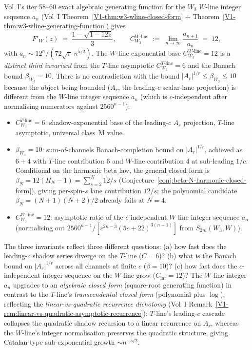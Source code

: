 \begin{remark}[\label{rem:beta-A-W3-wline-integer-sequence}
The $W_3$ $W$-line second lane: $C_{W_3}^{W\text{-line}} = 12$ is
a third invariant distinct from $\beta_{W_3} = 10$ and
$C_{W_3}^{T\text{-line}} = 6$]
Vol~I's iter 58--60 exact algebraic generating function for the
$W_3$ $W$-line integer sequence $a_n$
(Vol~I Theorem~\ref*{V1-thm:w3-wline-closed-form} +
Theorem~\ref*{V1-thm:w3-wline-generating-function}) gives
\[
 F'_{W}(z) \;=\; \frac{1 - \sqrt{1 - 12 z}}{3},
 \qquad
 C_{W_3}^{W\text{-line}} \;:=\;
 \lim_{n \to \infty} \frac{a_{n+1}}{a_n}
 \;=\; 12,
\]
with $a_n \sim 12^n / (72 \sqrt{\pi} \, n^{5/2})$. The $W$-line
exponential base $C_{W_3}^{W\text{-line}} = 12$ is a
\emph{distinct third invariant} from the $T$-line asymptotic
$C_{W_3}^{T\text{-line}} = 6$ and the Banach bound
$\beta_{W_3} = 10$. There is no contradiction with the bound
$|A_r|^{1/r} \le \beta_{W_3} \le 10$ because the object being
bounded ($A_r$, the leading-$c$ scalar-lane projection) is
different from the $W$-line integer sequence $a_n$ (which is
$c$-independent after normalising numerators against $2560^{n-1}$):
\begin{itemize}
 \item $C_{W_3}^{T\text{-line}} = 6$: shadow-exponential base of
 the leading-$c$ $A_r$ projection, $T$-line asymptotic,
 universal class~M value.
 \item $\beta_{W_3} = 10$: sum-of-channels Banach-completion
 bound on $|A_r|^{1/r}$, achieved as $6 + 4$ with
 $T$-line contribution $6$ and $W$-line contribution $4$
 at sub-leading $1/c$. Conditional on the harmonic
 beta law, the general closed form is
 $\beta_N = 12(H_N - 1) = \sum_{s=2}^{N} 12/s$
 (Conjecture~\ref{conj:beta-N-harmonic-closed-form}),
 giving per-spin-$s$ lane contribution $12/s$;
 the polynomial candidate $\beta_N = (N+1)(N+2)/2$
 already fails at $N=4$.
 \item $C_{W_3}^{W\text{-line}} = 12$: asymptotic ratio of the
 $c$-independent $W$-line integer sequence $a_n$
 (normalising out $2560^{n-1} / [c^{2n-3} (5c+22)^{3(n-1)}]$
 from $S_{2m}(W_3, W)$).
\end{itemize}
The three invariants reflect three different questions: (a) how
fast does the leading-$c$ shadow series diverge on the $T$-line
($C = 6$)? (b) what is the Banach bound on $|A_r|^{1/r}$ across
all channels at finite $c$ ($\beta = 10$)? (c) how fast does the
$c$-independent integer sequence on the $W$-line grow
($C_{\text{int}} = 12$)?
The $W$-line integer $a_n$ upgrades to an \emph{algebraic
closed form} (square-root generating function) in contrast to the
$T$-line's \emph{transcendental closed form}
(polynomial plus $\log$), reflecting the \emph{linear-vs-quadratic
recurrence dichotomy}
(Vol~I
Remark~\ref*{V1-rem:linear-vs-quadratic-asymptotic-recurrence}): $T$-line's
leading-$c$ cascade collapses the quadratic shadow recursion to a
linear recurrence on $A_r$, whereas the $W$-line's integer
normalisation preserves the quadratic structure, giving
Catalan-type sub-exponential growth $\sim n^{-5/2}$.
\end{remark}

